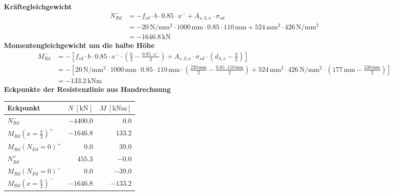 \documentclass[11pt,a4paper]{article}
\begin{document}
\noindent\textbf{Kräftegleichgewicht}
\begin{equation*}
\begin{aligned}
  N_{Rd}^{-} &= -f_{cd} \cdot b \cdot 0.85 \cdot x^{-} + A_{s,3,x} \cdot \sigma_{sd} \\
  &= -20\,\mathrm{N}/\mathrm{mm}^{2} \cdot 1000\,\mathrm{mm} \cdot 0.85 \cdot 110\,\mathrm{mm} + 524\,\mathrm{mm}^{2} \cdot 426\,\mathrm{N}/\mathrm{mm}^{2} \\
  &= -1646.8\,\mathrm{kN}
\end{aligned}
\end{equation*}
\noindent\textbf{Momentengleichgewicht um die halbe Höhe}
\begin{equation*}
\begin{aligned}
  M_{Rd}^{-} &= -\left[f_{cd} \cdot b \cdot 0.85 \cdot x^{-} \cdot \left(\tfrac{h}{2} - \tfrac{0.85 \cdot x^{-}}{2}\right) + A_{s,3,x} \cdot \sigma_{sd} \cdot \left(d_{3,x} - \tfrac{h}{2}\right)\right] \\
  &= -\left[20\,\mathrm{N}/\mathrm{mm}^{2} \cdot 1000\,\mathrm{mm} \cdot 0.85 \cdot 110\,\mathrm{mm} \cdot \left(\tfrac{220\,\mathrm{mm}}{2} - \tfrac{0.85 \cdot 110\,\mathrm{mm}}{2}\right) + 524\,\mathrm{mm}^{2} \cdot 426\,\mathrm{N}/\mathrm{mm}^{2} \cdot \left(177\,\mathrm{mm} - \tfrac{220\,\mathrm{mm}}{2}\right)\right] \\
  &= -133.2\,\mathrm{kNm}
\end{aligned}
\end{equation*}
\noindent\textbf{Eckpunkte der Resistenzlinie aus Handrechnung}
\begin{longtable}{lrr}
\hline
Eckpunkt & $N\ [\mathrm{kN}]$ & $M\ [\mathrm{kNm}]$ \\
\hline
\endhead
$N_{Rd}^{-}$ & $-4400.0$ & $0.0$ \\
$M_{Rd}(x=\tfrac{h}{2})^{+}$ & $-1646.8$ & $133.2$ \\
$M_{Rd}(N_{Ed}=0)^{+}$ & $0.0$ & $39.0$ \\
$N_{Rd}^{+}$ & $455.3$ & $-0.0$ \\
$M_{Rd}(N_{Ed}=0)^{-}$ & $0.0$ & $-39.0$ \\
$M_{Rd}(x=\tfrac{h}{2})^{-}$ & $-1646.8$ & $-133.2$ \\
\hline
\end{longtable}
\end{document}
